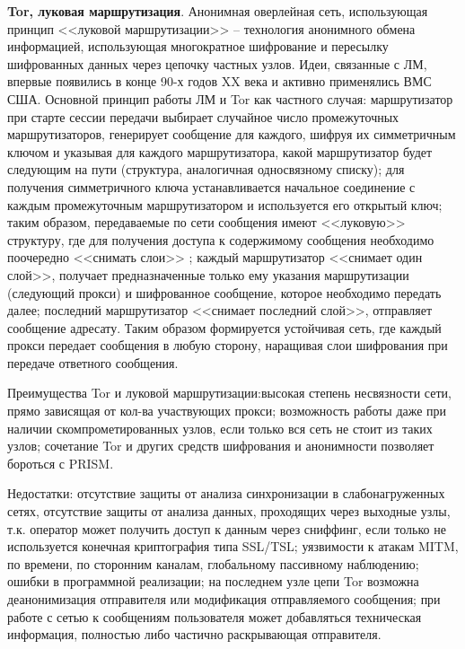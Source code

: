 \textbf{Tor, луковая маршрутизация}. Анонимная оверлейная сеть, использующая принцип <<луковой маршрутизации>> -- технология анонимного обмена информацией, использующая многократное шифрование и пересылку шифрованных данных через цепочку частных узлов. Идеи, связанные с ЛМ, впервые появились в конце 90-х годов XX века и активно применялись ВМС США. Основной принцип работы ЛМ и Tor как частного случая: маршрутизатор при старте сессии  передачи выбирает случайное число промежуточных маршрутизаторов, генерирует сообщение для каждого, шифруя их симметричным ключом и указывая для каждого маршрутизатора, какой маршрутизатор будет следующим на пути (структура, аналогичная односвязному списку); для получения симметричного ключа устанавливается начальное соединение с каждым промежуточным маршрутизатором и используется его открытый ключ; таким образом, передаваемые по сети сообщения имеют <<луковую>> структуру, где для получения доступа к содержимому сообщения необходимо поочередно <<снимать слои>> ; каждый маршрутизатор <<снимает один слой>>, получает предназначенные только ему указания маршрутизации (следующий прокси) и шифрованное сообщение, которое необходимо передать далее; последний маршрутизатор <<снимает последний слой>>, отправляет сообщение адресату. Таким образом формируется устойчивая сеть, где каждый прокси передает сообщения в любую сторону, наращивая слои шифрования при передаче ответного сообщения. %

Преимущества Tor и луковой маршрутизации:высокая степень несвязности сети, прямо зависящая от кол-ва участвующих прокси; возможность работы даже при наличии скомпрометированных узлов, если только вся сеть не стоит из таких узлов; сочетание Tor и других средств шифрования и анонимности позволяет бороться с PRISM. %


Недостатки: отсутствие защиты от анализа синхронизации в слабонагруженных сетях, отсутствие защиты   от анализа данных, проходящих через выходные узлы, т.к. оператор может получить доступ к данным через сниффинг, если только не используется конечная криптография типа SSL/TSL; уязвимости к атакам MITM,  по времени, по сторонним каналам, глобальному пассивному наблюдению;  %
ошибки  в программной реализации; на последнем узле цепи Tor возможна деанонимизация отправителя или модификация отправляемого сообщения;  при работе с сетью  к сообщениям пользователя может добавляться техническая информация, полностью либо частично раскрывающая отправителя. %

